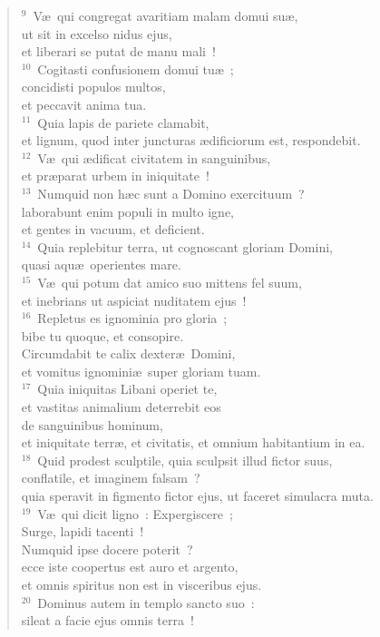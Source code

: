 \begin{flushleft}
\begin{verse}
${}^{9}$~V\ae\ qui congregat avaritiam malam domui su\ae ,\\ ut sit in excelso nidus ejus,\\ et liberari se putat de manu mali~!\\
${}^{10}$~Cogitasti confusionem domui tu\ae~;\\ concidisti populos multos,\\ et peccavit anima tua.\\
${}^{11}$~Quia lapis de pariete clamabit,\\ et lignum, quod inter juncturas \ae dificiorum est, respondebit.\\
${}^{12}$~V\ae\ qui \ae dificat civitatem in sanguinibus,\\ et pr\ae parat urbem in iniquitate~!\\
${}^{13}$~Numquid non h\ae c sunt a Domino exercituum~?\\ laborabunt enim populi in multo igne,\\ et gentes in vacuum, et deficient.\\
${}^{14}$~Quia replebitur terra, ut cognoscant gloriam Domini,\\ quasi aqu\ae\ operientes mare.\\
${}^{15}$~V\ae\ qui potum dat amico suo mittens fel suum,\\ et inebrians ut aspiciat nuditatem ejus~!\\
${}^{16}$~Repletus es ignominia pro gloria~;\\ bibe tu quoque, et consopire.\\ Circumdabit te calix dexter\ae\ Domini,\\ et vomitus ignomini\ae\ super gloriam tuam.\\
${}^{17}$~Quia iniquitas Libani operiet te,\\ et vastitas animalium deterrebit eos\\ de sanguinibus hominum,\\ et iniquitate terr\ae , et civitatis, et omnium habitantium in ea.\\
${}^{18}$~Quid prodest sculptile, quia sculpsit illud fictor suus,\\ conflatile, et imaginem falsam~?\\ quia speravit in figmento fictor ejus, ut faceret simulacra muta.\\
${}^{19}$~V\ae\ qui dicit ligno~: Expergiscere~;\\ Surge, lapidi tacenti~!\\ Numquid ipse docere poterit~?\\ ecce iste coopertus est auro et argento,\\ et omnis spiritus non est in visceribus ejus.\\
${}^{20}$~Dominus autem in templo sancto suo~:\\ sileat a facie ejus omnis terra~!\end{verse}\end{flushleft}


